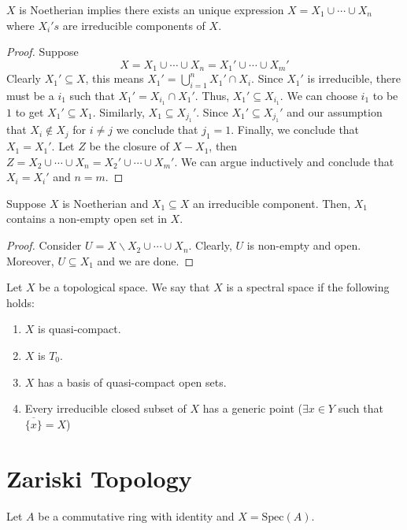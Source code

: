 \documentclass[oneside, 12pt, ]{scrbook}
\newcommand{\spec}{\mathrm{Spec}}
\theoremstyle{theorem}
\begin{document}
\begin{lemma}
$X$ is Noetherian implies there exists an unique expression $X = X_{1} \cup \cdots \cup X_{n}$ where $X_{i}'s$ are irreducible components of $X$.
\end{lemma}

\begin{proof}
Suppose $$X = X_{1} \cup \cdots \cup X_{n} = X_{1}' \cup \cdots \cup X_{m}'$$ Clearly $X_{1}' \subseteq X$, this means $X_{1}' = \bigcup_{i=1}^n X_{1}' \cap X_{i}$. Since $X_{1}'$ is irreducible, there must be a $i_{1}$ such that $X_{1}' = X_{i_{1}} \cap X_{1}'$. Thus, $X_{1}' \subseteq X_{i_{1}}$. We can choose $i_{1}$ to be $1$ to get $X_{1}' \subseteq X_{1}$. Similarly, $X_{1} \subseteq X_{j_{1}}'$. Since $X_{1}' \subseteq X_{j_{1}}'$ and our assumption that $X_{i} \not \in X_{j}$ for $i \neq j$ we conclude that $j_{1}=1$. Finally, we conclude that $X_{1}=X_{1}'$. Let $Z$ be the closure of $X - X_{1}$, then $Z = X_{2} \cup \cdots \cup X_{n} = X_{2}' \cup \cdots \cup X_{m}' $. We can argue inductively and conclude that $X_{i} = X_{i}'$ and $n=m$. 
\end{proof}

\begin{lemma}
Suppose $X$ is Noetherian and $X_{1} \subseteq X$ an irreducible component. Then, $X_{1}$ contains a non-empty open set in $X$.
\end{lemma}

\begin{proof}
Consider $U = X \backslash X_{2} \cup \cdots \cup X_{n}$. Clearly, $U$ is non-empty and open. Moreover, $U \subseteq X_{1}$ and we are done. 
\end{proof}

\begin{definition}
Let $X$ be a topological space. We say that $X$ is a spectral space if the following holds: 
\begin{enumerate}
\item $X$ is quasi-compact.
\item $X$ is $T_{0}$.
\item $X$ has a basis of quasi-compact open sets.
\item Every irreducible closed subset of $X$ has a generic point ($\exists x \in Y$ such that $\overline{\{x\}}  = X$)
\end{enumerate}
\end{definition}

\section{Zariski Topology}
Let $A$ be a commutative ring with identity and $X = \spec(A)$. \\
\end{document}
